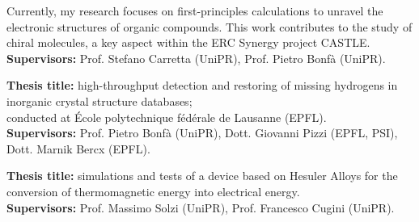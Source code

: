 \documentclass[10pt,a4paper,ragged2e]{altacv}
\begin{document}
\begin{paracol}{1}
\vspace{-7mm}
Currently, my research focuses on first-principles calculations to unravel the electronic structures of organic compounds. This work contributes to the study of chiral molecules, a key aspect within the ERC Synergy project CASTLE.\\
\vspace{1mm}
\textbf{Supervisors:} Prof. Stefano Carretta (UniPR), Prof. Pietro Bonfà (UniPR).\\
\divider


\vspace{2mm}
\textbf{Thesis title:} high-throughput detection and restoring of missing hydrogens in inorganic crystal structure databases;\\
conducted at École polytechnique fédérale de Lausanne (EPFL).
\\
\vspace{1mm}
\textbf{Supervisors:} Prof. Pietro Bonfà (UniPR), Dott. Giovanni Pizzi (EPFL, PSI), Dott. Marnik Bercx (EPFL).

\divider

\textbf{Thesis title:} simulations and tests of a device based on Hesuler Alloys for the conversion of thermomagnetic energy into electrical
energy.\\
\vspace{1mm}
\textbf{Supervisors:} Prof. Massimo Solzi (UniPR), Prof. Francesco Cugini (UniPR).




\end{paracol}
\end{document}
